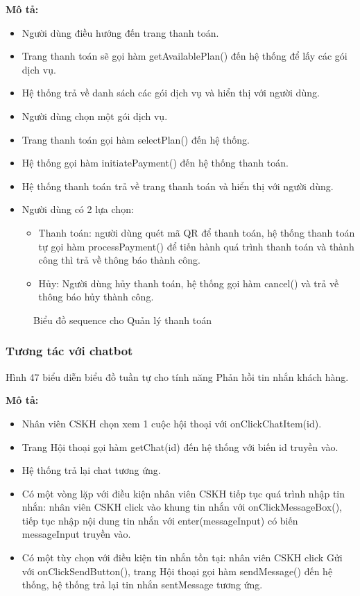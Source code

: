 \textbf{Mô tả: }
\begin{itemize}
	\item Người dùng điều hướng đến trang thanh toán.
	\item Trang thanh toán sẽ gọi hàm getAvailablePlan() đến hệ thống để lấy các gói dịch vụ.
	\item Hệ thống trả về danh sách các gói dịch vụ và hiển thị với người dùng.
	\item Người dùng chọn một gói dịch vụ.
	\item Trang thanh toán gọi hàm selectPlan() đến hệ thống.
	\item Hệ thống gọi hàm initiatePayment() đến hệ thống thanh toán.
	\item Hệ thống thanh toán trả về trang thanh toán và hiển thị với người dùng.
	\item Người dùng có 2 lựa chọn:
	\begin{itemize}
		\item Thanh toán: người dùng quét mã QR để thanh toán, hệ thống thanh toán tự gọi hàm processPayment() để tiến hành quá trình thanh toán và thành công thì trả về thông báo thành công.
		\item Hủy: Người dùng hủy thanh toán, hệ thống gọi hàm cancel() và trả về thông báo hủy thành công.
	\end{itemize}
\end{itemize}

\begin{figure}[H]
    \centering
     
    \vspace{0.5cm}
    \caption{Biểu đồ sequence cho Quản lý thanh toán}
    \label{fig:enter-label}
\end{figure}

\subsubsection{Tương tác với chatbot}
Hình 47 biểu diễn biểu đồ tuần tự cho tính năng Phản hồi tin nhắn khách hàng.

\textbf{Mô tả: }
\begin{itemize}
	\item Nhân viên CSKH chọn xem 1 cuộc hội thoại với onClickChatItem(id).
	\item Trang Hội thoại gọi hàm getChat(id) đến hệ thống với biến id truyền vào.
	\item Hệ thống trả lại chat tương ứng.
	\item Có một vòng lặp với điều kiện nhân viên CSKH tiếp tục quá trình nhập tin nhắn: nhân viên CSKH click vào khung tin nhắn với onClickMessageBox(), tiếp tục nhập nội dung tin nhắn với enter(messageInput) có biến messageInput truyền vào.
	\item Có một tùy chọn với điều kiện tin nhắn tồn tại: nhân viên CSKH click Gửi với onClickSendButton(), trang Hội thoại gọi hàm sendMessage() đến hệ thống, hệ thống trả lại tin nhắn sentMessage tương ứng.
\end{itemize}


